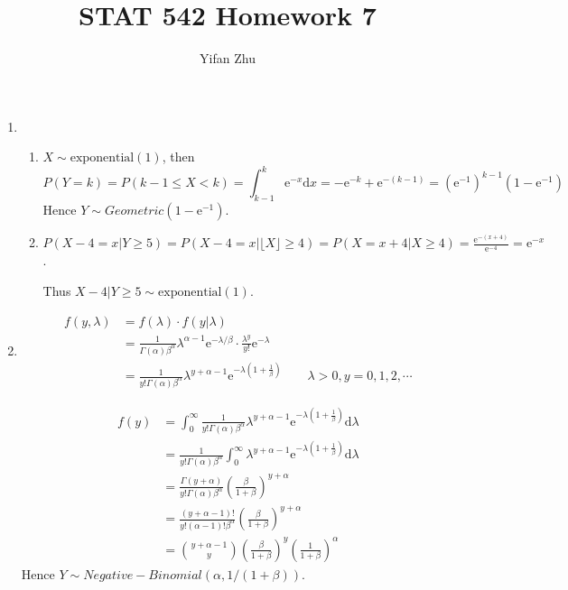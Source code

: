 \documentclass{article}
\begin{document}
	

	
	\title{STAT 542 Homework 7}
	\author{Yifan Zhu}
	\maketitle
	
	\begin{enumerate}[leftmargin = 0 em, label = \arabic*., font = \bfseries]
	\item 
	\begin{enumerate}
		\item
	$X \sim \textrm{exponential}(1)$, then 
	\[P(Y = k) = P( k - 1 \leq X < k) = \int_{k-1}^{k} \mathrm{e}^{-x} \mathrm{d}x = - \mathrm{e}^{-k} + \mathrm{e}^{-(k-1)} = (\mathrm{e}^{-1})^{k-1} (1 - \mathrm{e}^{-1})\]
	Hence $Y \sim Geometric( 1 - \mathrm{e}^{-1})$.

	\item 
	$P(X - 4 = x | Y \geq 5) = P(X - 4 = x | \lfloor X \rfloor \geq 4 ) = P(X = x + 4 | X \geq 4) = \frac{\mathrm{e}^{-(x + 4)}}{\mathrm{e}^{-4}} = \mathrm{e}^{-x}$.

	Thus $X - 4 | Y \geq 5 \sim \textrm{exponential}(1)$.
	\end{enumerate}


	\item 
	\begin{align*}
	f(y , \lambda) & = f(\lambda) \cdot f(y | \lambda) \\
	& = \frac{1}{\Gamma(\alpha) \beta^\alpha} \lambda^{\alpha - 1} \mathrm{e}^{- \lambda / \beta} \cdot \frac{\lambda^y}{y!} \mathrm{e}^{-\lambda}\\
	& = \frac{1}{y! \Gamma(\alpha) \beta^\alpha} \lambda^{y +\alpha -1} \mathrm{e}^{-\lambda (1 + \frac{1}{\beta})} \qquad  \lambda > 0, y = 0,1,2,\cdots
	\end{align*}

	\begin{align*}
	f(y) &= \int_0^\infty \frac{1}{y! \Gamma(\alpha) \beta^\alpha} \lambda^{y +\alpha -1} \mathrm{e}^{-\lambda (1 + \frac{1}{\beta})} \mathrm{d}\lambda\\
	& = \frac{1}{y! \Gamma(\alpha)\beta^\alpha} \int_{0}^\infty \lambda^{y + \alpha -1} \mathrm{e}^{- \lambda (1 + \frac{1}{\beta})} \mathrm{d}\lambda\\
	& = \frac{\Gamma(y + \alpha)}{y! \Gamma (\alpha) \beta^\alpha} \left(\frac{\beta}{1 + \beta}\right)^{y +\alpha}\\
	& = \frac{(y + \alpha -1)!}{y! (\alpha -1)! \beta^\alpha}\left(\frac{\beta}{1 + \beta}\right)^{y +\alpha}\\
	& = \binom{y + \alpha -1}{y} \left(\frac{\beta}{1 + \beta}\right)^y \left(\frac{1}{1 + \beta}\right)^\alpha
	\end{align*}
Hence $Y \sim Negative-Binomial(\alpha , 1/(1 + \beta))$.


\end{enumerate}
\end{document}
